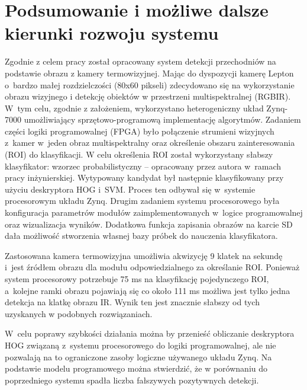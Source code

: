 \chapter{Podsumowanie i możliwe dalsze kierunki rozwoju systemu}

Zgodnie z celem pracy został opracowany system detekcji przechodniów na podstawie obrazu z kamery termowizyjnej. 
Mając do dyspozycji kamerę Lepton o~bardzo małej rozdzielczości (80x60 pikseli) zdecydowano się na wykorzystanie obrazu wizyjnego i detekcję obiektów w przestrzeni multispektralnej (RGBIR). 
W~tym celu, zgodnie z założeniem, wykorzystano heterogeniczny układ Zynq-7000 umożliwiający sprzętowo-programową implementację algorytmów.
Zadaniem części logiki programowalnej (FPGA) było połączenie strumieni wizyjnych z~kamer w~jeden obraz multispektralny oraz określenie obszaru zainteresowania (ROI) do klasyfikacji. 
W celu określenia ROI został wykorzystany słabszy klasyfikator: wzorzec probabilistyczny -- opracowany przez autora w~ramach pracy inżynierskiej. 
Wytypowany kandydat był następnie klasyfikowany przy użyciu deskryptora HOG i~SVM. 
Proces ten odbywał się w~systemie procesorowym układu Zynq. 
Drugim zadaniem systemu procesorowego była konfiguracja parametrów modułów zaimplementowanych w~logice programowalnej oraz wizualizacja wyników. 
Dodatkowa funkcja zapisania obrazów na karcie SD dała możliwość stworzenia własnej bazy próbek do nauczenia klasyfikatora.

Zastosowana kamera termowizyjna umożliwia akwizycję 9 klatek na sekundę i~jest źródłem obrazu dla modułu odpowiedzialnego za określanie ROI. 
Ponieważ system procesorowy potrzebuje 75 ms na klasyfikację pojedynczego ROI, a~kolejne ramki obrazu pojawiają się co około 111 ms możliwa jest tylko jedna detekcja na klatkę obrazu IR. 
Wynik ten jest znacznie słabszy od tych uzyskanych w podobnych rozwiązaniach. %

W~celu poprawy szybkości działania można by przenieść obliczanie deskryptora HOG związaną z~systemu procesorowego do logiki programowalnej, ale nie pozwalają na to ograniczone zasoby logiczne używanego układu Zynq. 
Na podstawie modelu programowego można stwierdzić, że w porównaniu do
poprzedniego systemu spadła liczba fałszywych pozytywnych detekcji.
